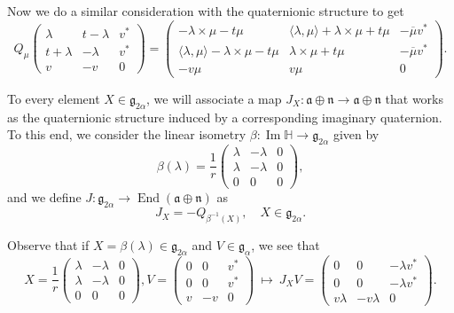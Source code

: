 \documentclass[12pt, a4paper,draft]{amsart}
\newcommand{\g}{\mathfrak}
\renewcommand{\H}{\mathbb{H}}
\renewcommand{\Im}{\operatorname{Im}}
\theoremstyle{remark}
\begin{document}
Now we do a similar consideration with the quaternionic structure to get 
\[
Q_{\mu}\left(
\begin{array}{cc|c}
	\lambda & t-\lambda & v^{*} \\
	t+\lambda & -\lambda & v^{*} \\
	\hline
	v & -v & 0
\end{array}
\right)
=\left(
\begin{array}{cc|c}
-\lambda\times\mu-t\mu & \langle\lambda,\mu\rangle+\lambda\times\mu+t\mu & -\overline{\mu}v^{*} \\
\langle\lambda,\mu\rangle-\lambda\times\mu-t\mu & \lambda\times\mu+t\mu & -\overline{\mu}v^{*} \\
\hline
-v\mu & v\mu & 0
\end{array}
\right).
\]

To every element $X\in\g{g}_{2\alpha}$, we will associate a map $J_{X}\colon\g{a}\oplus\g{n}\to\g{a}\oplus\g{n}$ that works as the quaternionic structure induced by a corresponding imaginary quaternion.
To this end, we consider the linear isometry $\beta\colon\Im\H\to\g{g}_{2\alpha}$ given by
\begin{equation*}
	\beta(\lambda)=\frac{1}{r}\left(
	\begin{array}{cc|c}
		\lambda & -\lambda & 0 \\
		\lambda & -\lambda & 0 \\
		\hline
		0 & 0 & 0
	\end{array}
	\right),
\end{equation*}
and we define $J\colon\g{g}_{2\alpha}\to\operatorname{End}(\g{a}\oplus\g{n})$ as
\begin{equation*}
	J_{X}=-Q_{\beta^{-1}(X)}, \quad X\in\g{g}_{2\alpha}.
\end{equation*}

Observe that if $X=\beta(\lambda)\in\g{g}_{2\alpha}$ and $V\in\g{g}_{\alpha}$, we see that
\begin{equation*}
X=\frac{1}{r}\left(
\begin{array}{cc|c}
	\lambda & -\lambda & 0 \\
	\lambda & -\lambda & 0 \\
	\hline
	0 & 0 & 0
\end{array}
\right),
V=\left(
	\begin{array}{cc|c}
		0 & 0 & v^{*} \\
		0 & 0 & v^{*} \\
		\hline
		v & -v & 0
	\end{array}
\right)\ 
\mapsto\
J_{X}V=\left(
	\begin{array}{cc|c}
		0 & 0 & -\lambda v^{*} \\
		0 & 0 & -\lambda v^{*} \\
		\hline
		v\lambda & -v\lambda & 0
	\end{array}
\right).
\end{equation*}
\end{document}

